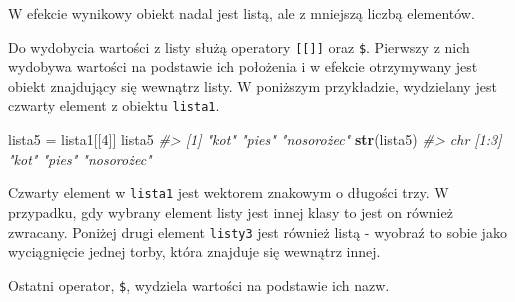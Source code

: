 \documentclass[paper=6in:9in,pagesize=pdftex,headinclude=on,footinclude=on,10pt]{scrbook}
\newenvironment{Shaded}{\begin{snugshade}}{\end{snugshade}}
\newcommand{\CommentTok}[1]{\textcolor[rgb]{0.56,0.35,0.01}{\textit{#1}}}
\newcommand{\DecValTok}[1]{\textcolor[rgb]{0.00,0.00,0.81}{#1}}
\newcommand{\KeywordTok}[1]{\textcolor[rgb]{0.13,0.29,0.53}{\textbf{#1}}}
\newcommand{\NormalTok}[1]{#1}
\newcommand{\OperatorTok}[1]{\textcolor[rgb]{0.81,0.36,0.00}{\textbf{#1}}}
\newcommand{\StringTok}[1]{\textcolor[rgb]{0.31,0.60,0.02}{#1}}
\begin{document}
W efekcie wynikowy obiekt nadal jest listą, ale z mniejszą liczbą elementów.

Do wydobycia wartości z listy służą operatory \texttt{{[}{[}{]}{]}} oraz \texttt{\$}.
Pierwszy z nich wydobywa wartości na podstawie ich położenia i w efekcie otrzymywany jest obiekt znajdujący się wewnątrz listy.
W poniższym przykładzie, wydzielany jest czwarty element z obiektu \texttt{lista1}.

\begin{Shaded}
\begin{Highlighting}[]
\NormalTok{lista5 =}\StringTok{ }\NormalTok{lista1[[}\DecValTok{4}\NormalTok{]]}
\NormalTok{lista5}
\CommentTok{#> [1] "kot"       "pies"      "nosorożec"}
\KeywordTok{str}\NormalTok{(lista5)}
\CommentTok{#>  chr [1:3] "kot" "pies" "nosorożec"}
\end{Highlighting}
\end{Shaded}

Czwarty element w \texttt{lista1} jest wektorem znakowym o długości trzy.
W przypadku, gdy wybrany element listy jest innej klasy to jest on również zwracany.
Poniżej drugi element \texttt{listy3} jest również listą - wyobraź to sobie jako wyciągnięcie jednej torby, która znajduje się wewnątrz innej.

\begin{Shaded}
\end{Shaded}

Ostatni operator, \texttt{\$}, wydziela wartości na podstawie ich nazw.

\begin{Shaded}
\end{Shaded}
\end{document}
